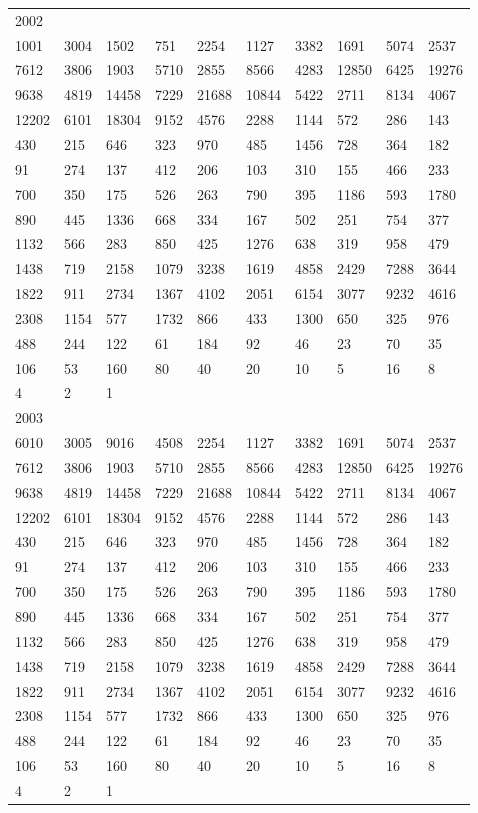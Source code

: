 \begin{longtable}{*{10}{l}}
2002&&&&&&&&&\\
1001& 3004& 1502& 751& 2254& 1127& 3382& 1691& 5074& 2537\\
7612& 3806& 1903& 5710& 2855& 8566& 4283& 12850& 6425& 19276\\
9638& 4819& 14458& 7229& 21688& 10844& 5422& 2711& 8134& 4067\\
12202& 6101& 18304& 9152& 4576& 2288& 1144& 572& 286& 143\\
430& 215& 646& 323& 970& 485& 1456& 728& 364& 182\\
91& 274& 137& 412& 206& 103& 310& 155& 466& 233\\
700& 350& 175& 526& 263& 790& 395& 1186& 593& 1780\\
890& 445& 1336& 668& 334& 167& 502& 251& 754& 377\\
1132& 566& 283& 850& 425& 1276& 638& 319& 958& 479\\
1438& 719& 2158& 1079& 3238& 1619& 4858& 2429& 7288& 3644\\
1822& 911& 2734& 1367& 4102& 2051& 6154& 3077& 9232& 4616\\
2308& 1154& 577& 1732& 866& 433& 1300& 650& 325& 976\\
488& 244& 122& 61& 184& 92& 46& 23& 70& 35\\
106& 53& 160& 80& 40& 20& 10& 5& 16& 8\\
4& 2& 1& \\

2003&&&&&&&&&\\
6010& 3005& 9016& 4508& 2254& 1127& 3382& 1691& 5074& 2537\\
7612& 3806& 1903& 5710& 2855& 8566& 4283& 12850& 6425& 19276\\
9638& 4819& 14458& 7229& 21688& 10844& 5422& 2711& 8134& 4067\\
12202& 6101& 18304& 9152& 4576& 2288& 1144& 572& 286& 143\\
430& 215& 646& 323& 970& 485& 1456& 728& 364& 182\\
91& 274& 137& 412& 206& 103& 310& 155& 466& 233\\
700& 350& 175& 526& 263& 790& 395& 1186& 593& 1780\\
890& 445& 1336& 668& 334& 167& 502& 251& 754& 377\\
1132& 566& 283& 850& 425& 1276& 638& 319& 958& 479\\
1438& 719& 2158& 1079& 3238& 1619& 4858& 2429& 7288& 3644\\
1822& 911& 2734& 1367& 4102& 2051& 6154& 3077& 9232& 4616\\
2308& 1154& 577& 1732& 866& 433& 1300& 650& 325& 976\\
488& 244& 122& 61& 184& 92& 46& 23& 70& 35\\
106& 53& 160& 80& 40& 20& 10& 5& 16& 8\\
4& 2& 1& \\


\end{longtable}
